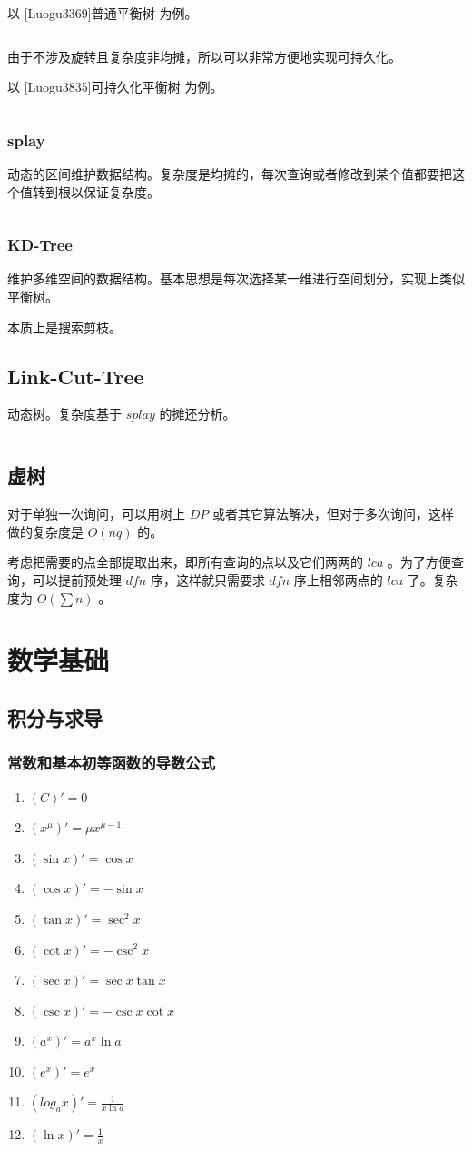 \documentclass[UTF-8]{ctexart}
\newcommand{\cpp}[1]{\inputminted[bgcolor=bg,breaklines,breakanywhere=true]{c++}{#1}}
\begin{document}
			以 [Luogu3369]普通平衡树 为例。
			\cpp{code/Example/Luogu3369.cpp}
	
			由于不涉及旋转且复杂度非均摊，所以可以非常方便地实现可持久化。
			
			以 [Luogu3835]可持久化平衡树 为例。
			\cpp{code/Example/Luogu3835.cpp}
			\subsubsection{splay}
			动态的区间维护数据结构。复杂度是均摊的，每次查询或者修改到某个值都要把这个值转到根以保证复杂度。
			\cpp{code//DataStruct//splay.cpp}
			\subsubsection{KD-Tree}
			维护多维空间的数据结构。基本思想是每次选择某一维进行空间划分，实现上类似平衡树。
	
			本质上是搜索剪枝。
		\subsection{Link-Cut-Tree}
		动态树。复杂度基于 $splay$ 的摊还分析。
		\cpp{code//DataStruct//lct.cpp}
		\subsection{虚树}
		对于单独一次询问，可以用树上 $DP$ 或者其它算法解决，但对于多次询问，这样做的复杂度是 $O(nq)$ 的。
	
		考虑把需要的点全部提取出来，即所有查询的点以及它们两两的 $lca$ 。为了方便查询，可以提前预处理 $dfn$ 序，这样就只需要求 $dfn$ 序上相邻两点的 $lca$ 了。复杂度为 $O(\sum n)$ 。
	\newpage
	\section{数学基础}
		\subsection{积分与求导}
			\subsubsection{常数和基本初等函数的导数公式}
			\begin{enumerate}
				\item $(C)'=0$
				\item $(x^\mu)'=\mu x^{\mu-1}$
				\item $(\sin x)'=\cos x$
				\item $(\cos x)'=-\sin x$
				\item $(\tan x)'=\sec^2 x$
				\item $(\cot x)'=-\csc^2 x$
				\item $(\sec x)'=\sec x \tan x$
				\item $(\csc x)'=-\csc x\cot x$
				\item $(a^x)'=a^x \ln a$
				\item $(e^x)'=e^x$
				\item $(log _ a x)'=\frac{1}{x \ln a}$
				\item $(\ln x)'=\frac{1}{x}$
			\end{enumerate}
\end{document}
